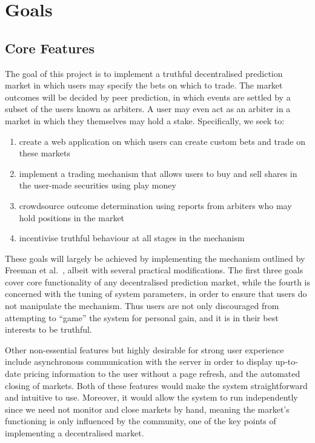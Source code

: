 \section{Goals}

\label{sec:goals}

\subsection{Core Features}

The goal of this project is to implement a truthful decentralised prediction
market in which users may specify the bets on which to trade. The market
outcomes will be decided by peer prediction, in which events are settled by a
subset of the users known as arbiters. A user may even act as an arbiter in a
market in which they themselves may hold a stake. Specifically, we seek to:

\begin{enumerate}
		\label{enm:goals}
	\item create a web application on which users can create custom bets and
		trade on these markets 
	\item implement a trading mechanism that allows users to buy and sell
		shares in the user-made securities using play money
	\item crowdsource outcome determination using reports from arbiters who may
		hold positions in the market
	\item incentivise truthful behaviour at all stages in the mechanism
\end{enumerate}

These goals will largely be achieved by implementing the mechanism outlined by
Freeman et al.~\cite{Freeman2017}, albeit with several practical modifications.
The first three goals cover core functionality of any decentralised prediction
market, while the fourth is concerned with the tuning of system parameters, in
order to ensure that users do not manipulate the mechanism. Thus users are
not only discouraged from attempting to ``game'' the system for personal gain,
and it is in their best interests to be truthful.

Other non-essential features but highly desirable for strong user experience
include asynchronous communication with the server in order to display
up-to-date pricing information to the user without a page refresh, and the
automated closing of markets. Both of these features would make the system
straightforward and intuitive to use. Moreover, it would allow the system to
run independently since we need not monitor and close markets by hand, meaning
the market's functioning is only influenced by the community, one of the key
points of implementing a decentralised market.

